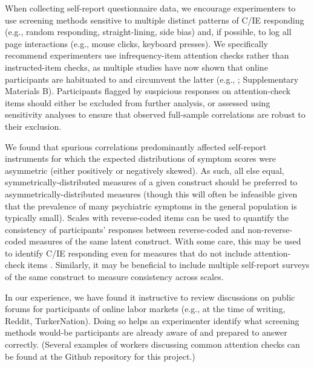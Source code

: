 \documentclass[a4paper,notitlepage,12pt]{article}
\begin{document}
When collecting self-report questionnaire data, we encourage experimenters to use screening methods sensitive to multiple distinct patterns of C/IE responding (e.g., random responding, straight-lining, side bias) and, if possible, to log all page interactions (e.g., mouse clicks, keyboard presses). We specifically recommend experimenters use infrequency-item attention checks rather than instructed-item checks, as multiple studies have now shown that online participants are habituated to and circumvent the latter (e.g., \cite{barends2019noncompliant, thomas2017validity, hauser2016attentive}; Supplementary Materials B). Participants flagged by suspicious responses on attention-check items should either be excluded from further analysis, or assessed using sensitivity analyses to ensure that observed full-sample correlations are robust to their exclusion.

We found that spurious correlations predominantly affected self-report instruments for which the expected distributions of symptom scores were asymmetric (either positively or negatively skewed). As such, all else equal, symmetrically-distributed measures of a given construct should be preferred to asymmetrically-distributed measures (though this will often be infeasible given that the prevalence of many psychiatric symptoms in the general population is typically small). Scales with reverse-coded items can be used to quantify the consistency of participants' responses between reverse-coded and non-reverse-coded measures of the same latent construct. With some care, this may be used to identify C/IE responding even for measures that do not include attention-check items \cite{emons2009detection}. Similarly, it may be beneficial to include multiple self-report surveys of the same construct to measure consistency across scales.
    
In our experience, we have found it instructive to review discussions on public forums for participants of online labor markets (e.g., at the time of writing, Reddit, TurkerNation). Doing so helps an experimenter identify what screening methods would-be participants are already aware of and prepared to answer correctly. (Several examples of workers discussing common attention checks can be found at the Github repository for this project.)
\end{document}
